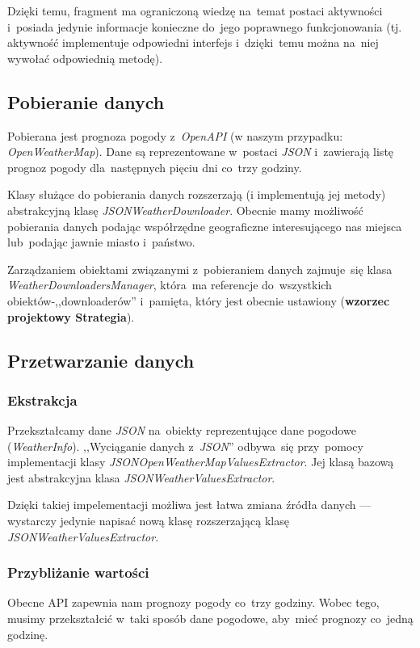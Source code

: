 \documentclass[11pt, a4paper, oneside]{scrartcl}
\begin{document}
Dzięki temu, fragment ma ograniczoną wiedzę na~temat postaci aktywności i~posiada jedynie informacje konieczne do~jego poprawnego funkcjonowania
(tj. aktywność implementuje odpowiedni interfejs i~dzięki~temu można na~niej wywołać odpowiednią metodę).

\subsection{Pobieranie danych}
Pobierana jest prognoza pogody z~\textit{OpenAPI} (w naszym przypadku: \textit{OpenWeatherMap}). Dane są reprezentowane w~postaci \textit{JSON}
i~zawierają listę prognoz pogody dla~następnych pięciu dni co~trzy godziny.

Klasy służące do pobierania danych rozszerzają (i implementują jej metody) abstrakcyjną klasę \textit{JSONWeatherDownloader}. 
Obecnie mamy możliwość pobierania danych podając współrzędne geograficzne interesującego nas miejsca lub~podając jawnie miasto i~państwo.

Zarządzaniem obiektami związanymi z~pobieraniem danych zajmuje~się klasa \textit{WeatherDownloadersManager}, która~ma referencje
do~wszystkich obiektów-,,downloaderów'' i~pamięta, który jest obecnie ustawiony (\textbf{wzorzec projektowy Strategia}).

\subsection{Przetwarzanie danych}
\subsubsection{Ekstrakcja}
Przekształcamy dane \textit{JSON} na~obiekty reprezentujące dane pogodowe
(\textit{WeatherInfo}).  ,,Wyciąganie danych z~\textit{JSON}'' odbywa~się przy~pomocy implementacji klasy \textit{JSONOpenWeatherMapValuesExtractor}. Jej klasą bazową jest abstrakcyjna klasa \textit{JSONWeatherValuesExtractor}.

Dzięki takiej impelementacji
możliwa jest łatwa zmiana źródła danych --- wystarczy jedynie napisać nową klasę rozszerzającą klasę \textit{JSONWeatherValuesExtractor}.

\subsubsection{Przybliżanie wartości}
Obecne API zapewnia nam prognozy pogody co~trzy godziny. Wobec tego, musimy przekształcić w~taki sposób dane pogodowe,
aby~mieć prognozy co~jedną godzinę.
\end{document}
